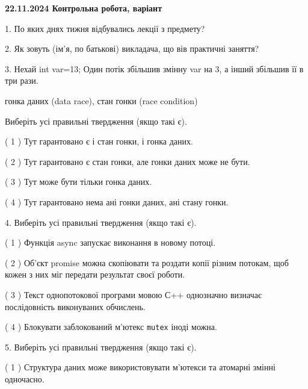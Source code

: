\documentclass[12pt, ukrainian]{article}
\def\code#1{\Verb!#1!}
\begin{document}
\vspace{4mm}
\newpage
\begin {large}

\textbf{22.11.2024 Контрольна робота, варіант  }\par


{
1. По яких днях тижня відбувались лекції з предмету?



\vspace{5mm}
2. Як зовуть (ім'я, по батькові) викладача, що вів практичні заняття?



\vspace{5mm}
3. Нехай int var=13; Один потік збільшив змінну var на 3, а інший збільшив її в три рази.

гонка даних (data race), стан гонки (race condition)

Виберіть усі правильні твердження (якщо такі є).\par
\vspace{2mm}
( 1 ) Тут гарантовано є і стан гонки, і гонка даних.%

( 2 ) Тут гарантовано є стан гонки, але гонки даних може не бути.%

( 3 ) Тут може бути тільки гонка даних.%

( 4 ) Тут гарантовано нема ані гонки даних, ані стану гонки.%


\vspace{5mm}
4. Виберіть усі правильні твердження (якщо такі є).\par
\vspace{2mm}

( 1 ) Функція async запускає виконання в новому потоці.%

( 2 ) Об’єкт promise можна скопіювати та роздати копії різним потокам, щоб кожен з них міг передати результат своєї роботи.%

( 3 ) Текст однопотокової програми мовою С++ однозначно визначає послідовність виконуваних обчислень.%

( 4 ) Блокувати заблокований м’ютекс  \code{mutex} іноді можна.%


\vspace{5mm}
5. Виберіть усі правильні твердження (якщо такі є).\par
\vspace{2mm}

( 1 ) Структура даних може використовувати м’ютекси та атомарні змінні одночасно.%

}
\end{large}
\end{document}
